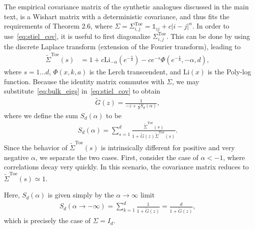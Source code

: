 \documentclass{article}
\begin{document}
The empirical covariance matrix of the synthetic analogues discussed in the main text, is a Wishart matrix with a deterministic covariance, and thus fits the requirements of Theorem 2.6, where $\Sigma=\Sigma^\mathrm{Toe}_{i,j}=\mathbb{1}_{ij}+c|i-j|^\alpha$. 
In order to use~\cref{eq:stiel_cov}, it is useful to first diagonalize $\Sigma^\mathrm{Toe}_{i,j}$. This can be done by using the discrete Laplace transform (extension of the Fourier transform), leading to  
\begin{align}
\label{eq:bulk_eigs}
    \tilde{\Sigma}^\mathrm{Toe}(s)
    &=
   1
   +c \text{Li}_{-\alpha }\left(e^{-\frac{s}{d}}\right)
   -c e^{-s} \Phi \left(e^{-\frac{s}{d}},-\alpha ,d\right), 
\end{align}
where $s=1\ldots d$, $\Phi(x,k,a)$ is the Lerch transcendent, and $\text{Li}(x)$ is the Poly-log function.
Because the identity matrix commutes with $\Sigma$, we may substitute~\cref{eq:bulk_eigs} in~\cref{eq:stiel_cov} to obtain
\begin{align}
\label{eq:stiel_solve}
\tilde{G}(z) =
\frac{1}
    {-z+\frac{\gamma}{d} S_d(\alpha)
    },
\end{align}
where we define the sum $S_d(\alpha)$ to be
\begin{align}
\label{eq:sum}
S_d(\alpha)=\sum_{s=1}^d
\frac{\tilde{\Sigma}^\mathrm{Toe}(s)}{1+ \tilde{G}(z) \tilde{\Sigma}^\mathrm{Toe}(s)}
     .
\end{align}
Since the behavior of $\tilde{\Sigma}^\mathrm{Toe}(s)$ is intrinsically different for positive and very negative $\alpha$, we separate the two cases. 
First, consider the case of $\alpha <-1$, where correlations decay very quickly. In this scenario, the covariance matrix reduces to $\tilde{\Sigma}^\mathrm{Toe}(s)\simeq 1$. 

Here, $S_d(\alpha)$ is given simply by the $\alpha \to \infty$ limit
\begin{align}
S_d(\alpha \to -\infty)=\sum_{k=1}^d
    \frac{1}{1+\tilde{G}(z) }
    =
    \frac{d}{1+\tilde{G}(z) }
    ,
\end{align}
which is precisely the case of $\Sigma = I_d$.
\end{document}
